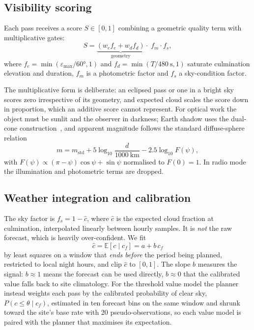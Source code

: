 \documentclass[conference]{IEEEtran}
\begin{document}
\subsection{Visibility scoring}
Each pass receives a score $S \in [0,1]$ combining a geometric quality term with
multiplicative gates:
\begin{equation}
S = \underbrace{\left(w_e f_e + w_d f_d\right)}_{\text{geometry}}
    \cdot \; f_m \cdot f_s ,
\label{eq:score}
\end{equation}
where $f_e = \min(\varepsilon_\mathrm{max}/\ang{60},1)$ and
$f_d = \min(T/\SI{480}{\second},1)$ saturate culmination elevation and duration,
$f_m$ is a photometric factor and $f_s$ a sky-condition factor.

The multiplicative form is deliberate: an eclipsed pass or one in a bright sky
scores zero irrespective of its geometry, and expected cloud scales the score
down in proportion, which an additive score cannot represent. For optical work
the object must be sunlit and
the observer in darkness; Earth shadow uses the dual-cone
construction~\cite{vallado2022fundamentals}, and apparent magnitude follows the
standard diffuse-sphere relation~\cite{fankhauser2023brightness, mccants}
\begin{equation}
m = m_\mathrm{std} + 5\log_{10}\!\frac{d}{\SI{1000}{\kilo\metre}}
    - 2.5\log_{10} F(\psi),
\label{eq:mag}
\end{equation}
with $F(\psi) \propto (\pi-\psi)\cos\psi + \sin\psi$ normalised to $F(0)=1$. In
radio mode the illumination and photometric terms are dropped.

\subsection{Weather integration and calibration}
\label{sec:calib}
The sky factor is $f_s = 1 - \hat{c}$, where $\hat{c}$ is the expected cloud
fraction at culmination, interpolated linearly between hourly samples. It is
\emph{not} the raw forecast, which is heavily over-confident. We fit
\begin{equation}
\hat{c} = \mathbb{E}[c \mid c_f] = a + b\,c_f
\label{eq:calib}
\end{equation}
by least squares on a window that \emph{ends before} the period being planned,
restricted to local night hours, and clip $\hat{c}$ to $[0,1]$. The slope $b$
measures the signal: $b \approx 1$ means the forecast can be used directly,
$b \approx 0$ that the calibrated value falls back to site climatology. For the
threshold value model the planner instead weights
each pass by the calibrated probability of clear sky,
$P(c \le \theta \mid c_f)$, estimated in ten forecast bins on the same window
and shrunk toward the site's base rate with 20 pseudo-observations, so each value
model is paired with the planner that maximises its expectation.
\end{document}
